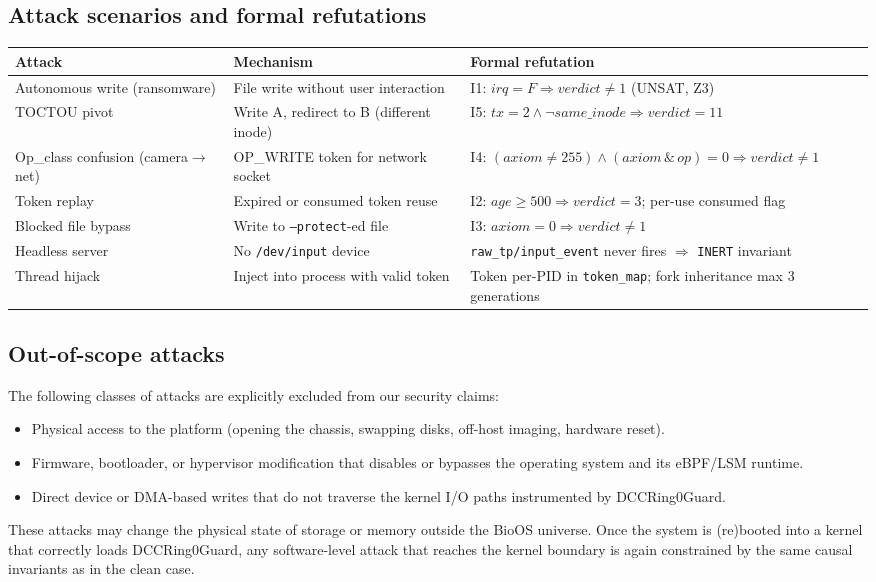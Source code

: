 \documentclass[11pt,a4paper,twoside]{article}
\begin{document}
\subsection{Attack scenarios and formal refutations}

\begin{longtable}{@{}p{3.2cm}p{3.8cm}p{5.4cm}@{}}
\toprule
\textbf{Attack} & \textbf{Mechanism} & \textbf{Formal refutation} \\ \midrule
\endhead \bottomrule \endfoot
Autonomous write (ransomware)
  & File write without user interaction
  & I1: $\mathit{irq}{=}F \Rightarrow \mathit{verdict}{\neq}1$ (UNSAT, Z3) \\[3pt]
TOCTOU pivot
  & Write A, redirect to B (different inode)
  & I5: $\mathit{tx}{=}2 \wedge \neg\mathit{same\_inode} \Rightarrow \mathit{verdict}{=}11$ \\[3pt]
Op\_class confusion (camera${\to}$net)
  & OP\_WRITE token for network socket
  & I4: $(\mathit{axiom}{\neq}255) \wedge (\mathit{axiom}\,\&\,\mathit{op}){=}0 \Rightarrow \mathit{verdict}{\neq}1$ \\[3pt]
Token replay
  & Expired or consumed token reuse
  & I2: $\mathit{age}{\geq}500 \Rightarrow \mathit{verdict}{=}3$; per-use consumed flag \\[3pt]
Blocked file bypass
  & Write to \texttt{--protect}-ed file
  & I3: $\mathit{axiom}{=}0 \Rightarrow \mathit{verdict}{\neq}1$ \\[3pt]
Headless server
  & No \texttt{/dev/input} device
  & \texttt{raw\_tp/input\_event} never fires $\Rightarrow$ \texttt{INERT} invariant \\[3pt]
Thread hijack
  & Inject into process with valid token
  & Token per-PID in \texttt{token\_map}; fork inheritance max 3 generations \\
\end{longtable}

\subsection{Out-of-scope attacks}

The following classes of attacks are explicitly excluded from our security claims:
\begin{itemize}[topsep=2pt,itemsep=2pt]
  \item Physical access to the platform (opening the chassis, swapping disks,
        off-host imaging, hardware reset).
  \item Firmware, bootloader, or hypervisor modification that disables or bypasses
        the operating system and its eBPF/LSM runtime.
  \item Direct device or DMA-based writes that do not traverse the kernel I/O paths
        instrumented by DCCRing0Guard.
\end{itemize}
These attacks may change the physical state of storage or memory outside the BioOS
universe. Once the system is (re)booted into a kernel that correctly loads
DCCRing0Guard, any software-level attack that reaches the kernel boundary is again
constrained by the same causal invariants as in the clean case.
\end{document}
